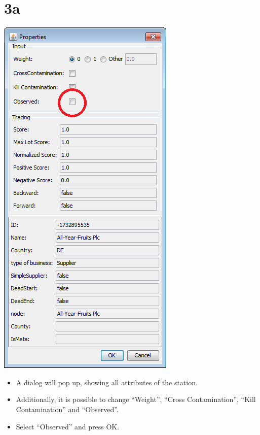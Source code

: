 \documentclass[10pt]{beamer}
\begin{document}
\section{3a}
\begin{frame}
	\begin{center}
  		\includegraphics[height=0.6\textheight]{3a.png}
	\end{center}
	\begin{itemize}
		\item A dialog will pop up, showing all attributes of the station.
		\item Additionally, it is possible to change ``Weight'', ``Cross Contamination'', ``Kill Contamination'' and ``Observed''.
		\item Select ``Observed'' and press OK.
	\end{itemize}
\end{frame}
\end{document}
